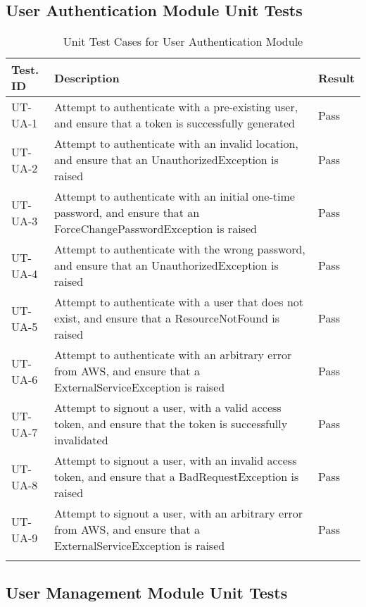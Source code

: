 \documentclass[12pt, titlepage]{article}
\begin{document}
\subsection{User Authentication Module Unit Tests}

\begin{longtable}{|m{2cm}|m{10cm}|m{1.4cm}|}
  \hline
  \textbf{Test. ID} & \textbf{Description} & \textbf{Result} \\ \hline
  UT-UA-1 & Attempt to authenticate with a pre-existing user, and
  ensure that a token is successfully generated & Pass\\ \hline
  UT-UA-2 & Attempt to authenticate with an invalid location, and
  ensure that an UnauthorizedException is raised & Pass\\ \hline
  UT-UA-3 & Attempt to authenticate with an initial one-time
  password, and ensure that an ForceChangePasswordException is raised
  & Pass\\ \hline
  UT-UA-4 & Attempt to authenticate with the wrong password, and
  ensure that an UnauthorizedException is raised & Pass\\ \hline
  UT-UA-5 & Attempt to authenticate with a user that does not exist,
  and ensure that a ResourceNotFound is raised & Pass\\ \hline
  UT-UA-6 & Attempt to authenticate with an arbitrary error from AWS,
  and ensure that a ExternalServiceException is raised & Pass\\ \hline
  UT-UA-7 & Attempt to signout a user, with a valid access token, and
  ensure that the token is successfully invalidated & Pass\\ \hline
  UT-UA-8 & Attempt to signout a user, with an invalid access token,
  and ensure that a BadRequestException is raised & Pass\\ \hline
  UT-UA-9 & Attempt to signout a user, with an arbitrary error from
  AWS, and ensure that a ExternalServiceException is raised & Pass\\ \hline
  \caption{Unit Test Cases for User Authentication Module}
\end{longtable}

\subsection{User Management Module Unit Tests}
\end{document}

